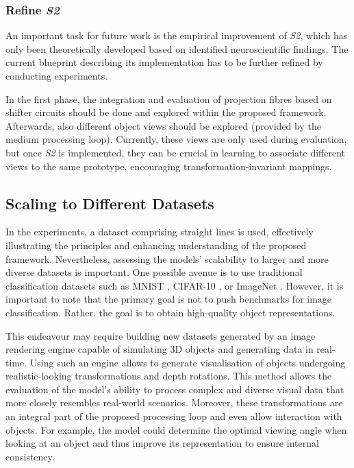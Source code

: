\subsubsection{Refine \emph{S2}}
An important task for future work is the empirical improvement of \emph{S2}, which has only been theoretically developed based on identified neuroscientific findings. The current blueprint describing its implementation has to be further refined by conducting experiments.

In the first phase, the integration and evaluation of projection fibres based on shifter circuits  should be done and explored within the proposed framework.
Afterwards, also different object views should be explored (provided by the medium processing loop). Currently, these views are only used during evaluation, but once \emph{S2} is implemented, they can be crucial in learning to associate different views to the same prototype, encouraging transformation-invariant mappings.


\subsection{Scaling to Different Datasets}
In the experiments, a dataset comprising straight lines is used, effectively illustrating the principles and enhancing understanding of the proposed framework.
Nevertheless, assessing the models' scalability to larger and more diverse datasets is important.
One possible avenue is to use traditional classification datasets such as MNIST , CIFAR-10 , or ImageNet .
However, it is important to note that the primary goal is not to push benchmarks for image classification.
Rather, the goal is to obtain high-quality object representations.

This endeavour may require building new datasets generated by an image rendering engine capable of simulating 3D objects and generating data in real-time.
Using such an engine allows to generate visualisation of objects undergoing realistic-looking transformations and depth rotations.
This method allows the evaluation of the model's ability to process complex and diverse visual data that more closely resembles real-world scenarios.
Moreover, these transformations are an integral part of the proposed processing loop and even allow interaction with objects. For example, the model could determine the optimal viewing angle when looking at an object and thus improve its representation to ensure internal consistency.



